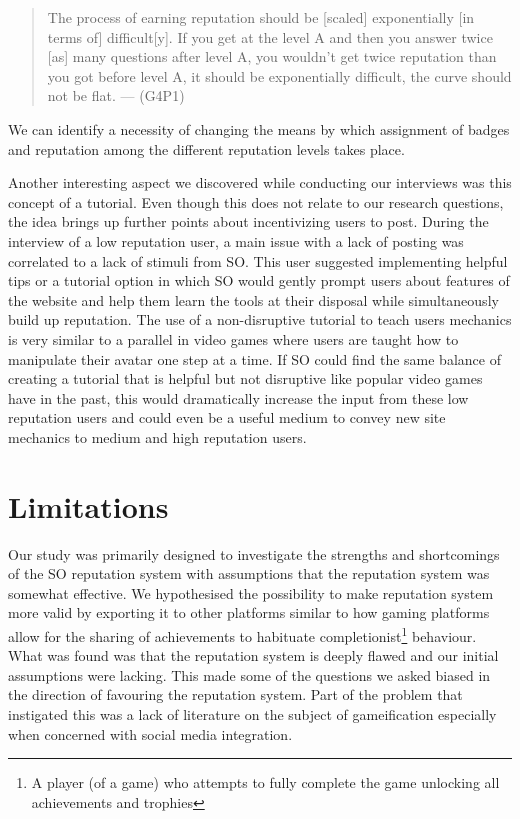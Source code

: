\documentclass{sigchi}
\begin{document}
\begin{quote}
The process of earning reputation should be [scaled] exponentially [in terms of] difficult[y]. If you get at the level A and then you answer twice [as] many questions after level A, you wouldn’t get twice reputation than you got before level A, it should be exponentially difficult, the curve should not be flat. --- (G4P1)
\end{quote}

We can identify a necessity of changing the means by which assignment of  badges and reputation among the different reputation levels takes place.

Another interesting aspect we discovered while conducting our interviews was this concept of a tutorial. Even though this does not relate to our research questions, the idea brings up further points about incentivizing users to post. During the interview of a low reputation user, a main issue with a lack of posting was correlated to a lack of stimuli from SO. This user suggested implementing helpful tips or a tutorial option in which SO would gently prompt users about features of the website and help them learn the tools at their disposal while simultaneously build up reputation. The use of a non-disruptive tutorial to teach users mechanics is very similar to a parallel in video games where users are taught how to manipulate their avatar one step at a time. If SO could find the same balance of creating a tutorial that is helpful but not disruptive like popular video games have in the past, this would dramatically increase the input from these low reputation users and could even be a useful medium to convey new site mechanics to medium and high reputation users.


\section{Limitations}

Our study was primarily designed to investigate the strengths and shortcomings of the SO reputation system with assumptions that the reputation system was somewhat effective. We hypothesised the possibility to make reputation system more valid by exporting it to other platforms similar to how gaming platforms allow for the sharing of achievements to habituate completionist\footnote{A player (of a game) who attempts to fully complete the game unlocking all achievements and trophies} behaviour. What was found was that the reputation system is deeply flawed and our initial assumptions were lacking. This made some of the questions we asked biased in the direction of favouring the reputation system. Part of the problem that instigated this was a lack of literature on the subject of gameification especially when concerned with social media integration.
\end{document}
